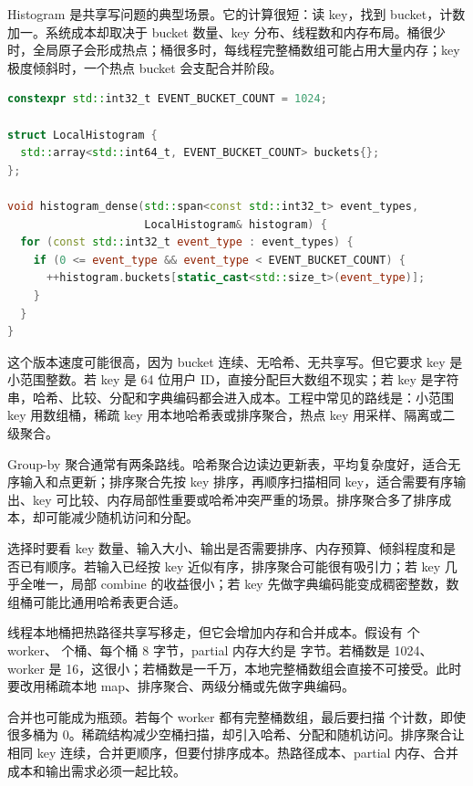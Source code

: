 Histogram 是共享写问题的典型场景。它的计算很短：读 key，找到 bucket，计数加一。系统成本却取决于 bucket 数量、key 分布、线程数和内存布局。桶很少时，全局原子会形成热点；桶很多时，每线程完整桶数组可能占用大量内存；key 极度倾斜时，一个热点 bucket 会支配合并阶段。

\begin{lstlisting}[language=C++,caption={稠密 key 的本地直方图}]
constexpr std::int32_t EVENT_BUCKET_COUNT = 1024;

struct LocalHistogram {
  std::array<std::int64_t, EVENT_BUCKET_COUNT> buckets{};
};

void histogram_dense(std::span<const std::int32_t> event_types,
                     LocalHistogram& histogram) {
  for (const std::int32_t event_type : event_types) {
    if (0 <= event_type && event_type < EVENT_BUCKET_COUNT) {
      ++histogram.buckets[static_cast<std::size_t>(event_type)];
    }
  }
}
\end{lstlisting}

这个版本速度可能很高，因为 bucket 连续、无哈希、无共享写。但它要求 key 是小范围整数。若 key 是 64 位用户 ID，直接分配巨大数组不现实；若 key 是字符串，哈希、比较、分配和字典编码都会进入成本。工程中常见的路线是：小范围 key 用数组桶，稀疏 key 用本地哈希表或排序聚合，热点 key 用采样、隔离或二级聚合。

Group-by 聚合通常有两条路线。哈希聚合边读边更新表，平均复杂度好，适合无序输入和点更新；排序聚合先按 key 排序，再顺序扫描相同 key，适合需要有序输出、key 可比较、内存局部性重要或哈希冲突严重的场景。排序聚合多了排序成本，却可能减少随机访问和分配。

选择时要看 key 数量、输入大小、输出是否需要排序、内存预算、倾斜程度和是否已有顺序。若输入已经按 key 近似有序，排序聚合可能很有吸引力；若 key 几乎全唯一，局部 combine 的收益很小；若 key 先做字典编码能变成稠密整数，数组桶可能比通用哈希表更合适。

线程本地桶把热路径共享写移走，但它会增加内存和合并成本。假设有  个 worker、 个桶、每个桶 8 字节，partial 内存大约是  字节。若桶数是 1024、worker 是 16，这很小；若桶数是一千万，本地完整桶数组会直接不可接受。此时要改用稀疏本地 map、排序聚合、两级分桶或先做字典编码。

合并也可能成为瓶颈。若每个 worker 都有完整桶数组，最后要扫描  个计数，即使很多桶为 0。稀疏结构减少空桶扫描，却引入哈希、分配和随机访问。排序聚合让相同 key 连续，合并更顺序，但要付排序成本。热路径成本、partial 内存、合并成本和输出需求必须一起比较。

